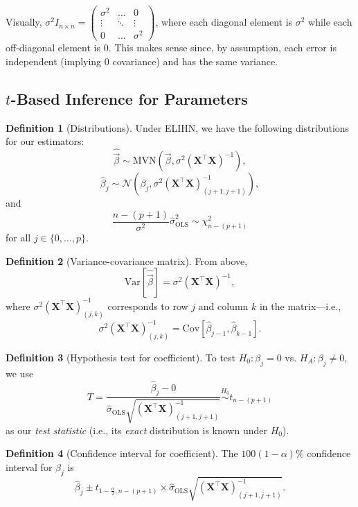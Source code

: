 \documentclass[12pt,oneside]{article}
\newcommand{\Var}{\text{Var}}
\newcommand{\Cov}{\text{Cov}}
\newcommand{\OLS}{\text{OLS}}
\newcommand{\N}{\mathcal{N}}
\newcommand{\MVN}{\text{MVN}}
\newcommand{\simnull}{\overset{H_0}{\sim}}
\theoremstyle{definition}
\newtheorem{definition}{Definition}
\theoremstyle{remark}
\begin{document}
\begin{solutionbox}
Visually, $\sigma^2 I_{n \times n} = 
\begin{pmatrix}
\sigma^2 & \ldots & 0 \\
\vdots & \ddots & \vdots \\
0 & \ldots & \sigma^2
\end{pmatrix}$, where each diagonal element is $\sigma^2$ while each off-diagonal element is $0$. This makes sense since, by assumption, each error is independent (implying $0$ covariance) and has the same variance.
\end{solutionbox}

\subsection{$t$-Based Inference for Parameters}

\begin{definition}[Distributions]
Under ELIHN, we have the following distributions for our estimators: \[\widehat{\vec{\beta}} \sim \MVN \left( \vec{\beta}, \sigma^2 (\boldsymbol{X}^{\top} \boldsymbol{X})^{-1} \right),\] \[\hat{\beta}_j \sim \N \left( \beta_j, \sigma^2 (\boldsymbol{X}^{\top} \boldsymbol{X})^{-1}_{(j + 1, j + 1)} \right),\] and \[\frac{n - (p + 1)}{\sigma^2} \hat{\sigma}^2_{\OLS} \sim \chi^2_{n - (p + 1)}\] for all $j \in \{0, \ldots, p\}$.
\end{definition}

\begin{definition}[Variance-covariance matrix]
From above, \[\Var[\widehat{\vec{\beta}}] = \sigma^2 (\boldsymbol{X}^{\top} \boldsymbol{X})^{-1},\] where $\sigma^2 (\boldsymbol{X}^{\top} \boldsymbol{X})^{-1}_{(j, k)}$ corresponds to row $j$ and column $k$ in the matrix—i.e., \[\sigma^2 (\boldsymbol{X}^{\top} \boldsymbol{X})^{-1}_{(j, k)} = \Cov[\hat{\beta}_{j - 1}, \hat{\beta}_{k - 1}].\]
\end{definition}

\begin{definition}[Hypothesis test for coefficient]
To test $H_0: \beta_j = 0$ vs. $H_A: \beta_j \neq 0$, we use \[T = \frac{\hat{\beta}_{j} - 0}{\hat{\sigma}_{\OLS} \sqrt{(\boldsymbol{X}^{\top} \boldsymbol{X})^{-1}_{(j + 1, j + 1)}}} \simnull t_{n - (p + 1)}\] as our \textit{test statistic} (i.e., its \textit{exact} distribution is known under $H_0$).
\end{definition}

\begin{definition}[Confidence interval for coefficient]
The $100(1 - \alpha)\%$ confidence interval for $\beta_j$ is \[\hat{\beta}_j \pm t_{1 - \frac{\alpha}{2}, n - (p + 1)} \times \hat{\sigma}_{\OLS} \sqrt{(\boldsymbol{X}^{\top} \boldsymbol{X})^{-1}_{(j + 1, j + 1)}}.\]
\end{definition}
\end{document}
